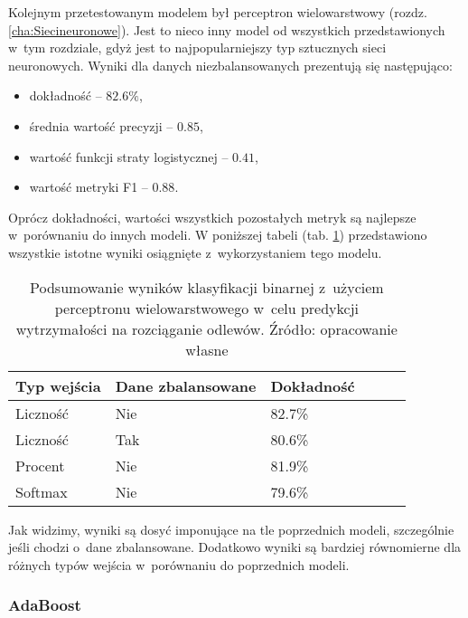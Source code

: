 Kolejnym przetestowanym modelem był perceptron wielowarstwowy (rozdz. \ref{cha:Siecineuronowe}). Jest to nieco inny model od wszystkich przedstawionych w~tym rozdziale, gdyż jest to najpopularniejszy typ sztucznych sieci neuronowych. Wyniki dla danych niezbalansowanych prezentują się następująco:
\begin{itemize}
	\item dokładność – $82.6\%$,
	\item średnia wartość precyzji – $0.85$,
	\item wartość funkcji straty logistycznej – $0.41$,
	\item wartość metryki F1 – $0.88$.
\end{itemize}
Oprócz dokładności, wartości wszystkich pozostałych metryk są najlepsze w~porównaniu do innych modeli.
W poniższej tabeli (tab. \ref{mlp.summary.table}) przedstawiono wszystkie istotne wyniki osiągnięte z~wykorzystaniem tego modelu.
\begin{table}[!h]
	\centering
	\begin{threeparttable}
		\caption{Podsumowanie wyników klasyfikacji binarnej z~użyciem perceptronu wielowarstwowego w~celu predykcji wytrzymałości na rozciąganie odlewów. Źródło: opracowanie własne}
		\label{mlp.summary.table}
		\begin{tabularx}{1\textwidth}{ |X|X|X|X|X|X| }
		  \hline
		  \textbf{Typ wejścia} & \textbf{Dane zbalansowane} & \textbf{Dokładność}  \\
		  \hline

	          Liczność & Nie & 82.7\%\\
		  \hline

	          Liczność & Tak & 80.6\%\\
		  \hline

	          Procent & Nie & 81.9\%\\
		  \hline

	          Softmax & Nie & 79.6\%\\
		  \hline
		\end{tabularx}
	\end{threeparttable}
\end{table}
Jak widzimy, wyniki są dosyć imponujące na tle poprzednich modeli, szczególnie jeśli chodzi o~dane zbalansowane. Dodatkowo wyniki są bardziej równomierne dla różnych typów wejścia w~porównaniu do poprzednich modeli.

\subsubsection{AdaBoost}
\label{structures.with.AdaBoost}

